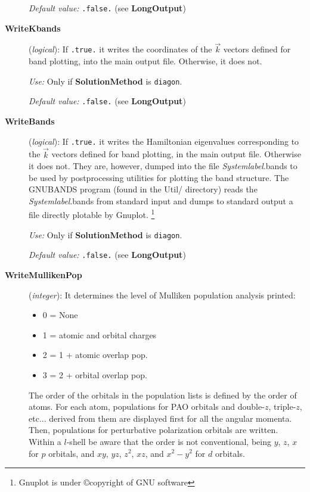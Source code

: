 \begin{description}
{\it Default value:} {\tt .false.} (see {\bf LongOutput})


\item[{\bf WriteKbands}] ({\it logical}):
If {\tt .true.} it writes the coordinates of the $\vec k$ vectors
defined for band plotting, into the main output file.
Otherwise, it does not.

{\it Use:} Only if {\bf SolutionMethod} is {\tt diagon}.

{\it Default value:} {\tt .false.} (see {\bf LongOutput})


\item[{\bf WriteBands}] ({\it logical}):
If {\tt .true.} it writes the Hamiltonian eigenvalues corresponding to
the $\vec k$ vectors defined for band plotting, in the main output file.
Otherwise it does not. They are, however, dumped into the file 
{\it Systemlabel}.bands to be used by postprocessing utilities for 
plotting the band structure. The GNUBANDS
program (found in the Util/ directory) reads the {\it Systemlabel}.bands
from standard input and dumps to standard output a file directly
plotable by {\sc Gnuplot}.
\footnote{{\sc Gnuplot} is under \copyright copyright of GNU software}

{\it Use:} Only if {\bf SolutionMethod} is {\tt diagon}.
 
{\it Default value:} {\tt .false.} (see {\bf LongOutput})


\item[{\bf WriteMullikenPop}] ({\it integer}): 
It determines the level of Mulliken population analysis printed:
\begin{itemize}
\item 0 = None
\item 1 = atomic and orbital charges
\item 2 = 1 + atomic overlap pop.
\item 3 = 2 + orbital overlap pop.
\end{itemize}
The order of the orbitals in the population lists is defined
by the order of atoms. For each atom, populations for PAO orbitals and
double-$z$, triple-$z$, etc... derived from them are displayed first for 
all the angular momenta. Then, populations for perturbative polarization
orbitals are written.
Within a $l$-shell be aware that the order is not
conventional, being $y$, $z$, $x$ for $p$ orbitals, and
$xy$, $yz$, $z^2$, $xz$, and $x^2-y^2$ for $d$ orbitals. 


\end{description}
